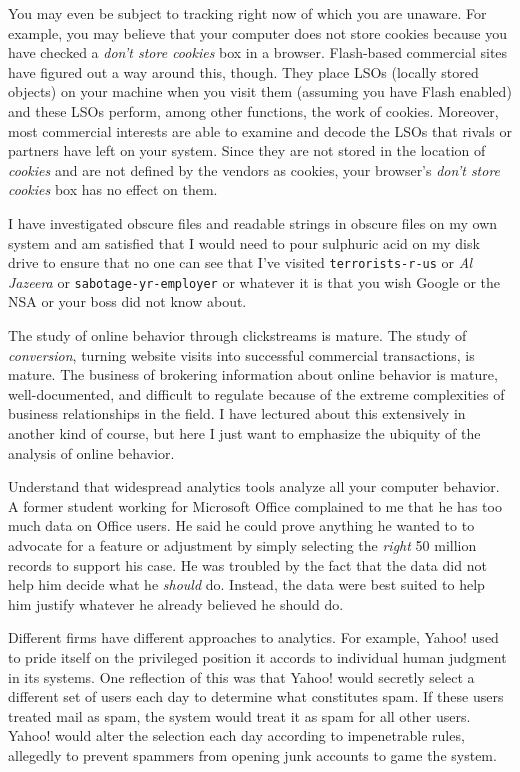 You may even be subject to tracking right now of which you are unaware.
For example, you may believe that your computer does not store cookies
because you have checked a \emph{don't store cookies} box in a browser.
Flash-based commercial sites have figured out a way around this, though.
They place LSOs (locally stored objects) on your machine when you visit
them (assuming you have Flash enabled) and these LSOs perform, among
other functions, the work of cookies. Moreover, most commercial
interests are able to examine and decode the LSOs that rivals or
partners have left on your system. Since they are not stored in the
location of \emph{cookies} and are not defined by the vendors as
cookies, your browser's \emph{don't store cookies} box has no effect on
them.

I have investigated obscure files and readable strings in obscure files
on my own system and am satisfied that I would need to pour sulphuric
acid on my disk drive to ensure that no one can see that I've visited
\texttt{terrorists-r-us} or \emph{Al Jazeera} or
\texttt{sabotage-yr-employer} or whatever it is that you wish Google or
the NSA or your boss did not know about.

The study of online behavior through clickstreams is mature. The study
of \emph{conversion}, turning website visits into successful commercial
transactions, is mature. The business of brokering information about
online behavior is mature, well-documented, and difficult to regulate
because of the extreme complexities of business relationships in the
field. I have lectured about this extensively in another kind of course,
but here I just want to emphasize the ubiquity of the analysis of online
behavior.

Understand that widespread analytics tools analyze all your computer
behavior. A former student working for Microsoft Office complained to me
that he has too much data on Office users. He said he could prove
anything he wanted to to advocate for a feature or adjustment by simply
selecting the \emph{right} 50 million records to support his case. He
was troubled by the fact that the data did not help him decide what he
\emph{should} do. Instead, the data were best suited to help him justify
whatever he already believed he should do.

Different firms have different approaches to analytics. For example,
Yahoo! used to pride itself on the privileged position it accords to
individual human judgment in its systems. One reflection of this was
that Yahoo! would secretly select a different set of users each day to
determine what constitutes spam. If these users treated mail as spam,
the system would treat it as spam for all other users. Yahoo! would
alter the selection each day according to impenetrable rules, allegedly
to prevent spammers from opening junk accounts to game the system.

